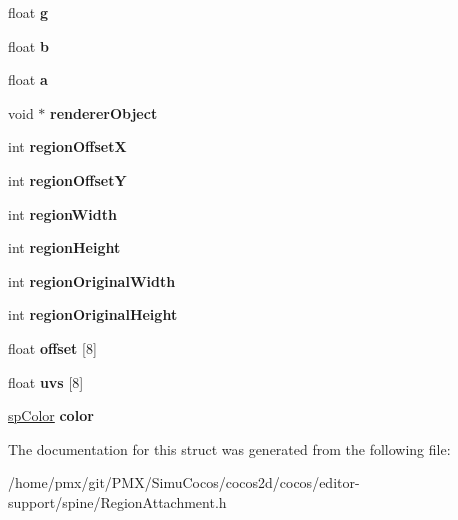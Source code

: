 \begin{DoxyCompactItemize}
float {\bfseries g}
\item 
\mbox{\label{structspRegionAttachment_a5f685c2582844aa680e7bdde129415a0}} 
float {\bfseries b}
\item 
\mbox{\label{structspRegionAttachment_acb60c299302cd35beb49a6e02cd8944a}} 
float {\bfseries a}
\item 
\mbox{\label{structspRegionAttachment_a59f050ec903e2c79fa7c51aee179e47e}} 
void $\ast$ {\bfseries renderer\+Object}
\item 
\mbox{\label{structspRegionAttachment_aff3cd0cff0321f4cf8e193718ca2988d}} 
int {\bfseries region\+OffsetX}
\item 
\mbox{\label{structspRegionAttachment_ad0453db68df8e07ef897783f7ff2afeb}} 
int {\bfseries region\+OffsetY}
\item 
\mbox{\label{structspRegionAttachment_a76f516cf8e5d0e6803af090b0ba38796}} 
int {\bfseries region\+Width}
\item 
\mbox{\label{structspRegionAttachment_a5745077899300bc75206c57333b1a12b}} 
int {\bfseries region\+Height}
\item 
\mbox{\label{structspRegionAttachment_acc63b861923010f45e3f0bed46e493ac}} 
int {\bfseries region\+Original\+Width}
\item 
\mbox{\label{structspRegionAttachment_a8c742fd67b6342de19535cf5afae4779}} 
int {\bfseries region\+Original\+Height}
\item 
\mbox{\label{structspRegionAttachment_a8e62edc7b8dd27e765045e0b41cdb525}} 
float {\bfseries offset} \mbox{[}8\mbox{]}
\item 
\mbox{\label{structspRegionAttachment_a33f101679015c40f12e1f97d616b1983}} 
float {\bfseries uvs} \mbox{[}8\mbox{]}
\item 
\mbox{\label{structspRegionAttachment_a14b575e9958b222382d1c194b10e16c0}} 
\hyperlink{structspColor}{sp\+Color} {\bfseries color}
\end{DoxyCompactItemize}


The documentation for this struct was generated from the following file\+:\begin{DoxyCompactItemize}
\item 
/home/pmx/git/\+P\+M\+X/\+Simu\+Cocos/cocos2d/cocos/editor-\/support/spine/Region\+Attachment.\+h\end{DoxyCompactItemize}
